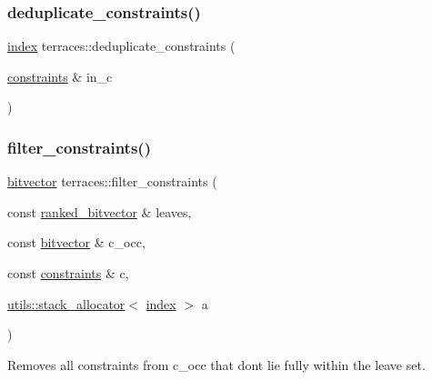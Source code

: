 \mbox{\label{namespaceterraces_a13888c94deeee29c8f5157c9071e3946}} 
\subsubsection{\texorpdfstring{deduplicate\+\_\+constraints()}{deduplicate\_constraints()}}
{\footnotesize\ttfamily \hyperlink{namespaceterraces_adbc33ccb543d1634e96d0eb02e472c77}{index} terraces\+::deduplicate\+\_\+constraints (\begin{DoxyParamCaption}\item[{\hyperlink{namespaceterraces_a6f603ffd30ed4d902fce6424492e0581}{constraints} \&}]{in\+\_\+c }\end{DoxyParamCaption})}

\mbox{\label{namespaceterraces_acece17bacc62c99a66bcc2a69e04f4d1}} 
\subsubsection{\texorpdfstring{filter\+\_\+constraints()}{filter\_constraints()}}
{\footnotesize\ttfamily \hyperlink{namespaceterraces_a1b526fb554dff829f7ad51eb21d5ed06}{bitvector} terraces\+::filter\+\_\+constraints (\begin{DoxyParamCaption}\item[{const \hyperlink{namespaceterraces_acc45ec9c561024c50ecbce5b6738ba08}{ranked\+\_\+bitvector} \&}]{leaves,  }\item[{const \hyperlink{namespaceterraces_a1b526fb554dff829f7ad51eb21d5ed06}{bitvector} \&}]{c\+\_\+occ,  }\item[{const \hyperlink{namespaceterraces_a6f603ffd30ed4d902fce6424492e0581}{constraints} \&}]{c,  }\item[{\hyperlink{classterraces_1_1utils_1_1stack__allocator}{utils\+::stack\+\_\+allocator}$<$ \hyperlink{namespaceterraces_adbc33ccb543d1634e96d0eb02e472c77}{index} $>$}]{a }\end{DoxyParamCaption})}

Removes all constraints from c\+\_\+occ that don\textquotesingle{}t lie fully within the leave set. \mbox{\label{namespaceterraces_a479ffe90c01af88c1683e743d417fe1a}} 
